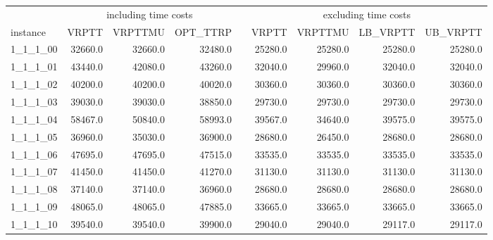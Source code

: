 %
\setlength\LTleft{-1in}
\setlength\LTright{-1in}
%
%
%
\begin{longtable}{lrrrcrrrr}
\toprule
%
& \multicolumn{3}{c}{including time costs} & \phantom{a}& \multicolumn{4}{c}{excluding time costs} \\
\cmidrule{2-4} \cmidrule{6-9}
%
%
%
instance &  VRPTT &  VRPTTMU &  OPT\_TTRP &&  VRPTT &  VRPTTMU &  LB\_VRPTT &  UB\_VRPTT \\
%
\midrule \endhead
1\_1\_1\_00      &     32660.0 &       32660.0 &        32480.0 &&       25280.0 &         25280.0 &          25280.0 &          25280.0 \\
1\_1\_1\_01      &     43440.0 &       42080.0 &        43260.0 &&       32040.0 &         29960.0 &          32040.0 &          32040.0 \\
1\_1\_1\_02      &     40200.0 &       40200.0 &        40020.0 &&       30360.0 &         30360.0 &          30360.0 &          30360.0 \\
1\_1\_1\_03      &     39030.0 &       39030.0 &        38850.0 &&       29730.0 &         29730.0 &          29730.0 &          29730.0 \\
1\_1\_1\_04      &     58467.0 &       50840.0 &        58993.0 &&       39567.0 &         34640.0 &          39575.0 &          39575.0 \\
1\_1\_1\_05      &     36960.0 &       35030.0 &        36900.0 &&       28680.0 &         26450.0 &          28680.0 &          28680.0 \\
1\_1\_1\_06      &     47695.0 &       47695.0 &        47515.0 &&       33535.0 &         33535.0 &          33535.0 &          33535.0 \\
1\_1\_1\_07      &     41450.0 &       41450.0 &        41270.0 &&       31130.0 &         31130.0 &          31130.0 &          31130.0 \\
1\_1\_1\_08      &     37140.0 &       37140.0 &        36960.0 &&       28680.0 &         28680.0 &          28680.0 &          28680.0 \\
1\_1\_1\_09      &     48065.0 &       48065.0 &        47885.0 &&       33665.0 &         33665.0 &          33665.0 &          33665.0 \\
1\_1\_1\_10      &     39540.0 &       39540.0 &        39900.0 &&       29040.0 &         29040.0 &          29117.0 &          29117.0 \\

\end{longtable}
